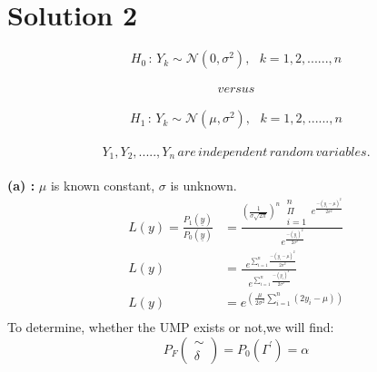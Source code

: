 \documentclass[a4paper,english,12pt]{article}
\begin{document}
\section{Solution 2}
$$H_0\,:\,Y_k\sim \mathcal{N}(0,\sigma^2), \, \,\,\,k=1,2, ...... ,n$$\\
         $$versus$$\\
 $$H_1\,:\,Y_k\sim \mathcal{N}(\mu,\sigma^2), \, \,\,\,k=1,2, ...... ,n$$\\        
 $$Y_1,Y_2,.....,Y_n \, are \, independent \, random \, variables.$$\\
 \textbf{(a) : } $\mu$ is known constant,
 $\sigma$ is unknown.\\
\begin{align*}
L(y)=\frac{P_1(\underline{y})}{P_0(\underline{y})}&=\frac{{\left(\frac{1}{\sigma \sqrt{2 \pi}}\right)}^n \,\,\substack{n\\ \Pi \\ {i=1}}\, e^{\frac{-(y_i - \mu)^2}{2 \sigma^2}}}{ \, e^{\frac{-(y_i)^2}{2 \sigma^2}}}\\
 L(y)&=\frac{\,\,\, e^{\sum\limits_{i=1}^n \frac{-(y_i - \mu)^2}{2 \sigma^2}}}{\, e^{\sum\limits_{i=1}^n\frac{-(y_i)^2}{2 \sigma^2}}}\\
 L(y)&=e^{\left(\frac{\mu}{2 \sigma^2}\sum\limits_{i=1}^n(2y_i-\mu)\right)}\\
\end{align*}
 To determine, whether the UMP exists or not,we will find:\\

 $$P_F(\substack{\sim \\ \delta})=P_0(\Gamma^\prime)=\alpha$$\\
 
\end{document}
